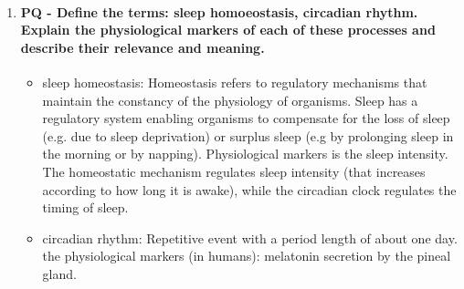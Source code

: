 \documentclass[12pt,article,oneside,a4paper]{memoir}
\begin{document}
\begin{enumerate}
\item \paragraph{PQ - Define the terms: sleep homoeostasis, circadian rhythm. Explain the physiological markers of each of these processes and describe their relevance and meaning.} 
\begin{itemize}
\item sleep homeostasis: Homeostasis refers to regulatory mechanisms that maintain the constancy of the physiology of organisms. Sleep has a regulatory system enabling organisms to compensate for the loss of sleep (e.g. due to sleep deprivation) or surplus sleep (e.g by prolonging sleep in the morning or by napping). Physiological markers is the sleep intensity. The homeostatic mechanism regulates sleep intensity (that increases according to how long it is awake), while the circadian clock regulates the timing of sleep.
\item circadian rhythm: Repetitive event with a period length of about one day. the physiological markers (in humans): melatonin secretion by the pineal gland.
\end{itemize}
\end{enumerate}

\end{document}
